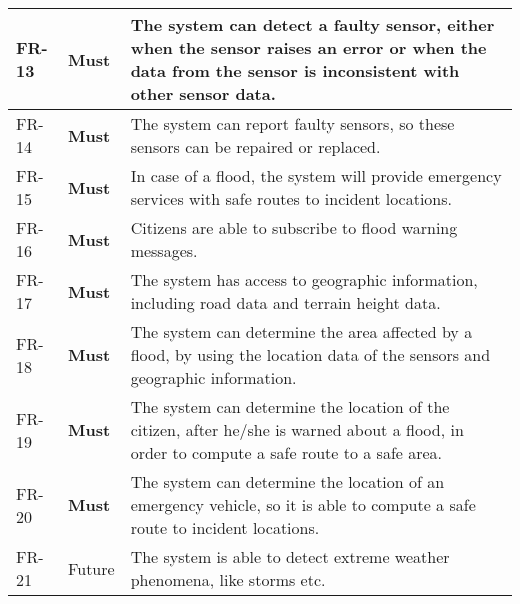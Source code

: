 \begin{longtable}{p{} p{} p{}}
    \hline {} \label{fr:13} FR-13 & 
      \textbf{Must} &
     The system can detect a faulty sensor, either when the sensor raises an error or when the data from the sensor is inconsistent with other sensor data. \\
	
    \hline {} \label{fr:14} FR-14 & 
      \textbf{Must} &
     The system can report faulty sensors, so these sensors can be repaired or replaced. \\ %
    
	\hline {} \label{fr:15} FR-15 & 
      \textbf{Must} &
     In case of a flood, the system will provide emergency services with safe routes to incident locations. \\
    
    \hline {} \label{fr:16} FR-16 & 
      \textbf{Must} &
     Citizens are able to subscribe to flood warning messages. \\
    
    \hline {} \label{fr:17} FR-17 & 
      \textbf{Must} &
     The system has access to geographic information, including road data and terrain height data. \\
    
    \hline {} \label{fr:18} FR-18 & 
      \textbf{Must} &
     The system can determine the area affected by a flood, by using the location data of the sensors and geographic information. \\
    
    \hline {} \label{fr:19} FR-19 & 
      \textbf{Must} &
     The system can determine the location of the citizen, after he/she is warned about a flood, in order to compute a safe route to a safe area. \\
    
    \hline {} \label{fr:20} FR-20 & 
      \textbf{Must} &
     The system can determine the location of an emergency vehicle, so it is able to compute a safe route to incident locations. \\
    
    
	
    \hline {} \label{fr:21} FR-21 & 
      Future &
     The system is able to detect extreme weather phenomena, like storms etc. \\
\end{longtable}